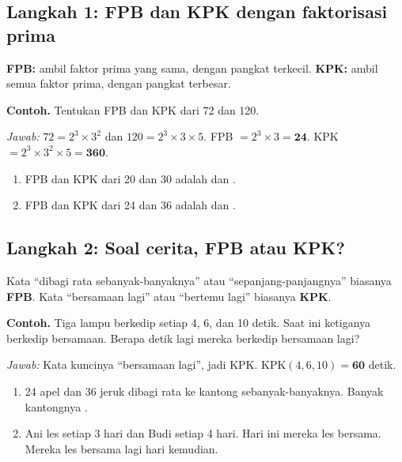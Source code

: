 \documentclass[11pt,a4paper]{article}
\begin{document}
\subsection*{Langkah 1: FPB dan KPK dengan faktorisasi prima}
\textbf{FPB:} ambil faktor prima yang sama, dengan pangkat terkecil.
\textbf{KPK:} ambil semua faktor prima, dengan pangkat terbesar.

\begin{contoh}
\textbf{Contoh.} Tentukan FPB dan KPK dari 72 dan 120.

\textit{Jawab:} $72 = 2^3 \times 3^2$ dan $120 = 2^3 \times 3 \times 5$.
FPB $= 2^3 \times 3 = \textbf{24}$. KPK $= 2^3 \times 3^2 \times 5 = \textbf{360}$.
\end{contoh}

\begin{giliranmu}
\begin{enumerate}[label=\alph*.]
    \item FPB dan KPK dari 20 dan 30 adalah \kosong{} dan \kosong.
    \item FPB dan KPK dari 24 dan 36 adalah \kosong{} dan \kosong.
\end{enumerate}
\end{giliranmu}

\subsection*{Langkah 2: Soal cerita, FPB atau KPK?}
Kata ``dibagi rata sebanyak-banyaknya'' atau ``sepanjang-panjangnya'' biasanya \textbf{FPB}.
Kata ``bersamaan lagi'' atau ``bertemu lagi'' biasanya \textbf{KPK}.

\begin{contoh}
\textbf{Contoh.} Tiga lampu berkedip setiap 4, 6, dan 10 detik. Saat ini ketiganya berkedip
bersamaan. Berapa detik lagi mereka berkedip bersamaan lagi?

\textit{Jawab:} Kata kuncinya ``bersamaan lagi'', jadi KPK. KPK$(4, 6, 10) = \textbf{60}$ detik.
\end{contoh}

\begin{giliranmu}
\begin{enumerate}[label=\alph*.]
    \item 24 apel dan 36 jeruk dibagi rata ke kantong sebanyak-banyaknya. Banyak kantongnya \kosong.
    \item Ani les setiap 3 hari dan Budi setiap 4 hari. Hari ini mereka les bersama. Mereka les
          bersama lagi \kosong{} hari kemudian.
\end{enumerate}
\end{giliranmu}
\end{document}
